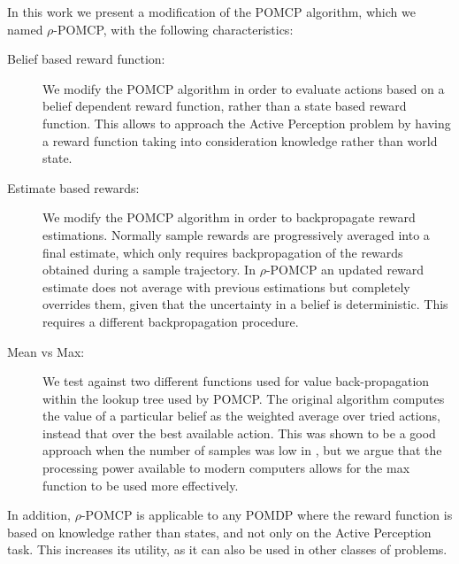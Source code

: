 In this work we present a modification of the POMCP algorithm, which we named $\rho$-POMCP, with the
following characteristics:

\begin{description}
    \item[Belief based reward function:] We modify the POMCP algorithm in order to evaluate actions
        based on a belief dependent reward function, rather than a state based reward function. This
        allows to approach the Active Perception problem by having a reward function taking into
        consideration knowledge rather than world state.
    \item[Estimate based rewards:] We modify the POMCP algorithm in order to backpropagate reward
        estimations. Normally sample rewards are progressively averaged into a final estimate, which
        only requires backpropagation of the rewards obtained during a sample trajectory. In
        $\rho$-POMCP an updated reward estimate does not average with previous estimations but
        completely overrides them, given that the uncertainty in a belief is deterministic.
        This requires a different backpropagation procedure.
    \item[Mean vs Max:] We test against two different functions used for value back-propagation within
        the lookup tree used by POMCP. The original algorithm computes the value of a particular
        belief as the weighted average over tried actions, instead that over the best available
        action. This was shown to be a good approach when the number of samples was low in
        \cite{cit:mcts}, but we argue that the processing power available to modern computers allows
        for the max function to be used more effectively.
\end{description}

In addition, $\rho$-POMCP is applicable to any POMDP where the reward function is based on knowledge
rather than states, and not only on the Active Perception task. This increases its utility, as it
can also be used in other classes of problems.

